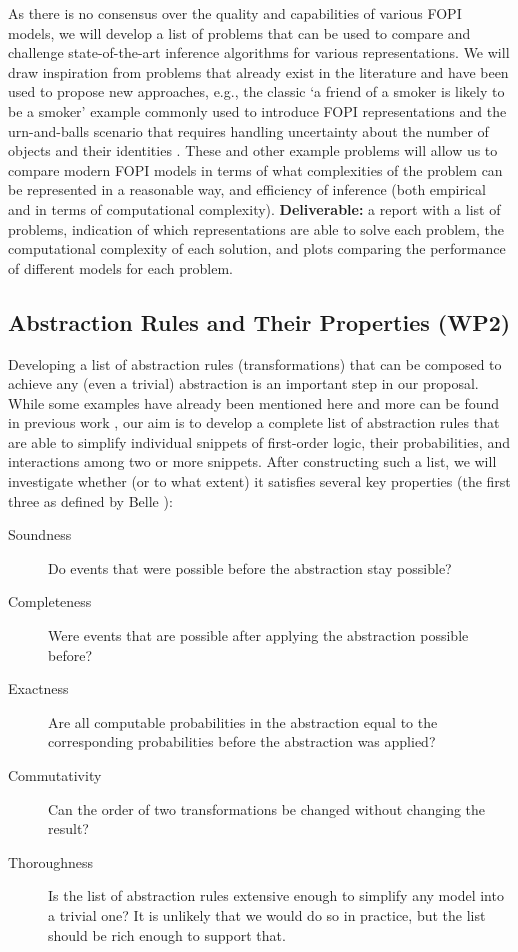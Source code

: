 \documentclass{article}
\begin{document}
As there is no consensus over the quality and capabilities of various
FOPI models, we will develop a list of problems that can be used to compare and
challenge state-of-the-art inference algorithms for various representations. We
will draw inspiration from problems that already exist in the literature and
have been used to propose new approaches, e.g., the classic `a friend of a
smoker is likely to be a smoker' example commonly used to introduce FOPI
representations
\cite{DBLP:series/sci/BrazAR08,DBLP:conf/ijcai/BroeckTMDR11,DBLP:journals/ml/RichardsonD06,DBLP:journals/cib/Venugopal17}
and the urn-and-balls scenario that requires handling uncertainty about the
number of objects and their identities \cite{DBLP:conf/ijcai/MilchMRSOK05}.
These and other example problems will allow us to compare modern FOPI models
in terms of what complexities of the problem can be represented in a reasonable
way, and efficiency of inference (both empirical and in terms of computational
complexity). \textbf{Deliverable:} a report with a list of problems, indication of
which representations are able to solve each problem, the computational
complexity of each solution, and plots comparing the performance of different
models for each problem.

\subsection{Abstraction Rules and Their Properties (WP2)}

Developing a list of abstraction rules (transformations) that can be composed to
achieve any (even a trivial) abstraction is an important step in our proposal.
While some examples have already been mentioned here and more can be found in
previous work
\cite{DBLP:journals/corr/abs-1810-02434,DBLP:journals/ai/GiunchigliaW92,DBLP:conf/uai/HoltzenMB17,saitta2013abstraction},
our aim is to develop a complete list of abstraction rules that are able to
simplify individual snippets of first-order logic, their probabilities, and
interactions among two or more snippets. After constructing such a list, we will
investigate whether (or to what extent) it satisfies several key properties (the
first three as defined by Belle \cite{DBLP:journals/corr/abs-1810-02434}):

\begin{description}
\item[Soundness] Do events that were possible before the abstraction stay
  possible?
\item[Completeness] Were events that are possible after applying the abstraction
  possible before?
\item[Exactness] Are all computable probabilities in the abstraction equal to
  the corresponding probabilities before the abstraction was applied?
\item[Commutativity] Can the order of two transformations be changed without
  changing the result?
\item[Thoroughness] Is the list of abstraction rules extensive enough to
  simplify any model into a trivial one? It is unlikely that we would do so in
  practice, but the list should be rich enough to support that.
\end{description}
\end{document}
